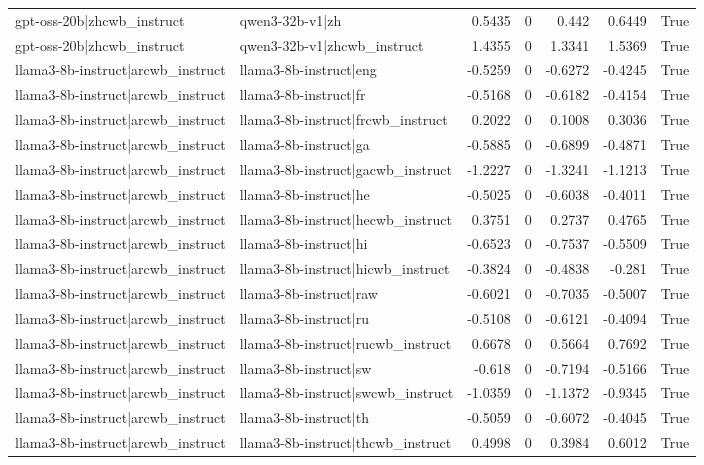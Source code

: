 \begin{table}
\begin{tabular}{l l r r r r l}
gpt-oss-20b|zhcwb_instruct & qwen3-32b-v1|zh & 0.5435 & 0 & 0.442 & 0.6449 & True \\
gpt-oss-20b|zhcwb_instruct & qwen3-32b-v1|zhcwb_instruct & 1.4355 & 0 & 1.3341 & 1.5369 & True \\
llama3-8b-instruct|arcwb_instruct & llama3-8b-instruct|eng & -0.5259 & 0 & -0.6272 & -0.4245 & True \\
llama3-8b-instruct|arcwb_instruct & llama3-8b-instruct|fr & -0.5168 & 0 & -0.6182 & -0.4154 & True \\
llama3-8b-instruct|arcwb_instruct & llama3-8b-instruct|frcwb_instruct & 0.2022 & 0 & 0.1008 & 0.3036 & True \\
llama3-8b-instruct|arcwb_instruct & llama3-8b-instruct|ga & -0.5885 & 0 & -0.6899 & -0.4871 & True \\
llama3-8b-instruct|arcwb_instruct & llama3-8b-instruct|gacwb_instruct & -1.2227 & 0 & -1.3241 & -1.1213 & True \\
llama3-8b-instruct|arcwb_instruct & llama3-8b-instruct|he & -0.5025 & 0 & -0.6038 & -0.4011 & True \\
llama3-8b-instruct|arcwb_instruct & llama3-8b-instruct|hecwb_instruct & 0.3751 & 0 & 0.2737 & 0.4765 & True \\
llama3-8b-instruct|arcwb_instruct & llama3-8b-instruct|hi & -0.6523 & 0 & -0.7537 & -0.5509 & True \\
llama3-8b-instruct|arcwb_instruct & llama3-8b-instruct|hicwb_instruct & -0.3824 & 0 & -0.4838 & -0.281 & True \\
llama3-8b-instruct|arcwb_instruct & llama3-8b-instruct|raw & -0.6021 & 0 & -0.7035 & -0.5007 & True \\
llama3-8b-instruct|arcwb_instruct & llama3-8b-instruct|ru & -0.5108 & 0 & -0.6121 & -0.4094 & True \\
llama3-8b-instruct|arcwb_instruct & llama3-8b-instruct|rucwb_instruct & 0.6678 & 0 & 0.5664 & 0.7692 & True \\
llama3-8b-instruct|arcwb_instruct & llama3-8b-instruct|sw & -0.618 & 0 & -0.7194 & -0.5166 & True \\
llama3-8b-instruct|arcwb_instruct & llama3-8b-instruct|swcwb_instruct & -1.0359 & 0 & -1.1372 & -0.9345 & True \\
llama3-8b-instruct|arcwb_instruct & llama3-8b-instruct|th & -0.5059 & 0 & -0.6072 & -0.4045 & True \\
llama3-8b-instruct|arcwb_instruct & llama3-8b-instruct|thcwb_instruct & 0.4998 & 0 & 0.3984 & 0.6012 & True \\

\end{tabular}
\end{table}
